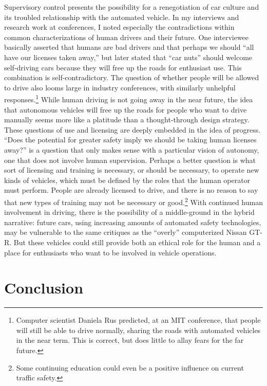 Supervisory control presents the possibility for a
renegotiation of car 
culture and its troubled relationship with the automated vehicle. In
my interviews and research work at conferences, I noted especially the
contradictions within common characterizations of human
drivers and their future. One interviewee basically asserted that
humans are bad drivers and that perhaps we should ``all have our
licenses taken away,'' but later stated that ``car nuts'' should
welcome self-driving cars because they will free up the roads for
enthusiast use. This combination is self-contradictory. The
question of whether people will be allowed to drive also looms large
in industry conferences, with similarly unhelpful
responses.\footnote{Computer scientist Daniela Rus predicted, at an MIT 
conference, that people will still be able to
drive normally, sharing the roads with automated vehicles in the near
term. This is correct, but does little to allay fears for the far future.} While
human driving is not going away in the near future, the idea that
autonomous vehicles will free up the roads for people who want to
drive manually seems more like a platitude than a thought-through
design strategy. These questions of use and licensing are deeply embedded in the idea
of progress. ``Does the potential for greater safety imply we should be
taking human licenses away?'' is a question that only makes
sense with a particular vision of autonomy, one that does not involve
human supervision. Perhaps a better question is what sort of licensing
and training is necessary, or should be necessary, to operate new
kinds of vehicles, which must be defined by the roles that the human
operator must perform. People are already licensed to drive, and there is no reason to
say that new types of training may not be necessary or good.\footnote{
Some continuing education could even be a positive
influence on current traffic safety.} With continued human
involvement in driving, there is 
the possibility of a
middle-ground in the hybrid narrative:  future cars, using increasing
amounts of automated safety technologies,
may be vulnerable to the same critiques as the ``overly'' computerized Nissan GT-R. But these
vehicles could still provide both an ethical role for the human and a place for
enthusiasts who want to be involved in vehicle operations.

\section{Conclusion}

